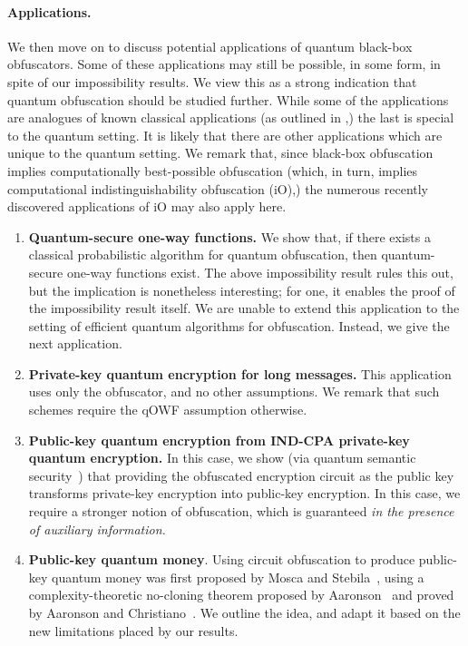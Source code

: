 \documentclass[envcountsame]{llncs}
\numberwithin{equation}{section}
\begin{document}
\paragraph{Applications.} We then move on to discuss potential applications of quantum black-box obfuscators. Some of these applications may still be possible, in some form, in spite of our impossibility results. We view this as a strong indication that quantum obfuscation should be studied further. While some of the applications are analogues of known classical applications (as outlined in \cite{BGIRSVY12},) the last is special to the quantum setting. It is likely that there are other applications which are unique to the quantum setting. We remark that, since black-box obfuscation implies computationally best-possible obfuscation (which, in turn, implies computational indistinguishability obfuscation (iO),) the numerous recently discovered applications of iO may also apply here.

\begin{enumerate}
\item \textbf{Quantum-secure one-way functions.} We show that, if there exists a classical probabilistic algorithm for quantum obfuscation, then quantum-secure one-way functions exist. The above impossibility result rules this out, but the implication is nonetheless interesting; for one, it enables the proof of the impossibility result itself. 
We are unable to extend this application to the setting of efficient quantum algorithms for obfuscation. Instead, we give the next application.
\item \textbf{Private-key quantum encryption for long messages.} This application uses only the obfuscator, and no other assumptions. We remark that such schemes require the qOWF assumption otherwise.
\item \textbf{Public-key quantum encryption from IND-CPA private-key quantum encryption.} In this case, we show (via quantum semantic security~\cite{ABFGSS16}) that providing the obfuscated encryption circuit as the public key transforms private-key encryption into public-key encryption. In this case, we require a stronger notion of obfuscation, which is guaranteed \emph{in the presence of auxiliary information.}
\item \textbf{Public-key quantum money}. Using circuit obfuscation to produce public-key quantum money was first proposed by Mosca and Stebila~\cite{MS10}, using a complexity-theoretic no-cloning theorem proposed by Aaronson~\cite{Aar09} and proved by Aaronson and Christiano~\cite{AC12}. We outline the idea, and adapt it based on the new limitations placed by our results.
\end{enumerate}
\end{document}
